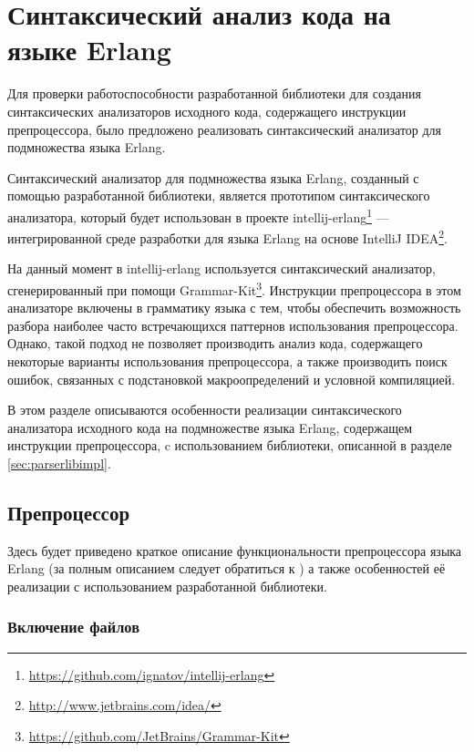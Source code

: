 \clearpage

\section{Синтаксический анализ кода на языке Erlang}
\label{sec:erlang}

Для проверки работоспособности разработанной библиотеки для создания синтаксических анализаторов исходного кода, содержащего инструкции препроцессора, было предложено реализовать синтаксический анализатор для подмножества языка Erlang. 

Синтаксический анализатор для подмножества языка Erlang, созданный с помощью разработанной библиотеки, является прототипом синтаксического анализатора, который будет использован в проекте intellij-erlang\footnote{\url{https://github.com/ignatov/intellij-erlang}} --- интегрированной среде разработки для языка Erlang на основе IntelliJ IDEA\footnote{\url{http://www.jetbrains.com/idea/}}.

На данный момент в intellij-erlang используется синтаксический анализатор, сгенерированный при помощи Grammar-Kit\footnote{\url{https://github.com/JetBrains/Grammar-Kit}}. Инструкции препроцессора в этом анализаторе включены в грамматику языка с тем, чтобы обеспечить возможность разбора наиболее часто встречающихся паттернов использования препроцессора. Однако, такой подход не позволяет производить анализ кода, содержащего некоторые варианты использования препроцессора, а также производить поиск ошибок, связанных с подстановкой макроопределений и условной компиляцией. 

В этом разделе описываются особенности реализации синтаксического анализатора исходного кода на подмножестве языка Erlang, содержащем инструкции препроцессора, c использованием библиотеки, описанной в разделе \ref{sec:parserlibimpl}.

\subsection{Препроцессор}

Здесь будет приведено краткое описание функциональности препроцессора языка Erlang (за полным описанием следует обратиться к \cite{erlangpreprocessor}) а также особенностей её реализации с использованием разработанной библиотеки.

\subsubsection{Включение файлов}

